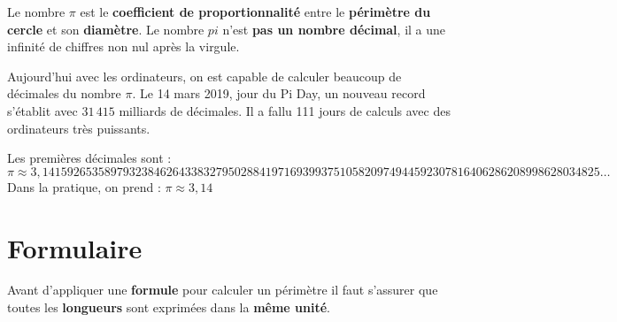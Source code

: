 \documentclass[a4paper,dvipsnames]{article}
\begin{document}
\begin{Def}
Le nombre $\pi$ est le \textbf{coefficient de proportionnalité} entre le \textbf{périmètre du cercle} et son \textbf{diamètre}. Le nombre $pi$ n'est \textbf{pas un nombre décimal}, il a une infinité de chiffres non nul après la virgule.
\end{Def}

\begin{Rq}
Aujourd'hui avec les ordinateurs, on est capable de calculer beaucoup de décimales du nombre $\pi$. Le 14 mars 2019, jour du Pi Day, un nouveau record s'établit avec \textcolor{sacado_green}{$31\,415$ milliards} de décimales. Il a fallu 111 jours de calculs avec des ordinateurs très puissants.

Les premières décimales sont :
\[\pi \approx 3,1415926535 8979323846 2643383279 5028841971 6939937510 5820974944
5923078164 0628620899 8628034825…\]
Dans la pratique, on prend : $\pi \approx 3,14$
\end{Rq}

\section{Formulaire}

\begin{Att}
Avant d'appliquer une \textbf{formule} pour calculer un périmètre il faut s'assurer que toutes les \textbf{longueurs} sont exprimées dans la \textbf{même unité}.
\end{Att}
\end{document}
